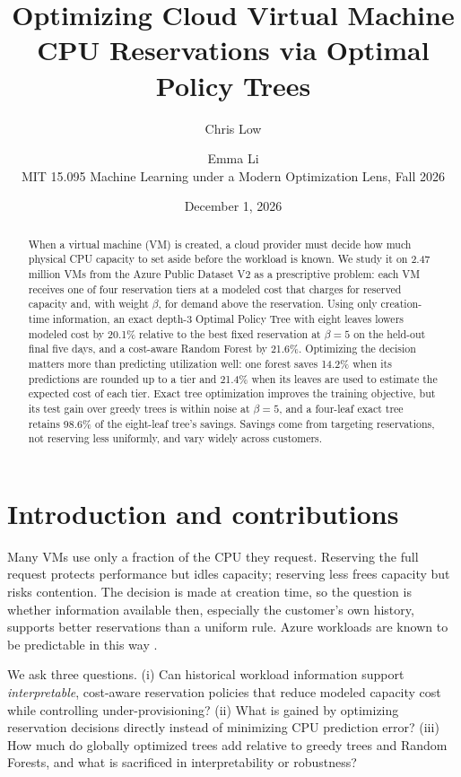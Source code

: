 \documentclass[10pt]{article}
\title{\vspace{-1.5em}Optimizing Cloud Virtual Machine CPU Reservations via Optimal Policy Trees}
\author{Chris Low \and Emma Li\\[1pt] \small MIT 15.095 Machine Learning under a Modern Optimization Lens, Fall 2026}
\date{\small December 1, 2026}
\begin{document}
\maketitle
\vspace{-1.8em}

\begin{abstract}
\noindent When a virtual machine (VM) is created, a cloud provider must decide how much physical CPU capacity to set aside before the workload is known. We study it on 2.47 million VMs from the Azure Public Dataset V2 as a prescriptive problem: each VM receives one of four reservation tiers at a modeled cost that charges for reserved capacity and, with weight $\beta$, for demand above the reservation. Using only creation-time information, an exact depth-3 Optimal Policy Tree with eight leaves lowers modeled cost by 20.1\% relative to the best fixed reservation at $\beta=5$ on the held-out final five days, and a cost-aware Random Forest by 21.6\%. Optimizing the decision matters more than predicting utilization well: one forest saves 14.2\% when its predictions are rounded up to a tier and 21.4\% when its leaves are used to estimate the expected cost of each tier. Exact tree optimization improves the training objective, but its test gain over greedy trees is within noise at $\beta=5$, and a four-leaf exact tree retains 98.6\% of the eight-leaf tree's savings. Savings come from targeting reservations, not reserving less uniformly, and vary widely across customers.
\end{abstract}

\section{Introduction and contributions}
\label{sec:intro}

Many VMs use only a fraction of the CPU they request. Reserving the full request protects performance but idles capacity; reserving less frees capacity but risks contention. The decision is made at creation time, so the question is whether information available then, especially the customer's own history, supports better reservations than a uniform rule. Azure workloads are known to be predictable in this way \citep{cortez2017resource}.

We ask three questions. (i) Can historical workload information support \emph{interpretable}, cost-aware reservation policies that reduce modeled capacity cost while controlling under-provisioning? (ii) What is gained by optimizing reservation decisions directly instead of minimizing CPU prediction error? (iii) How much do globally optimized trees add relative to greedy trees and Random Forests, and what is sacrificed in interpretability or robustness?
\end{document}
